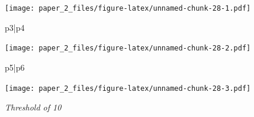 \documentclass[
]{article}
\newenvironment{Shaded}{\begin{snugshade}}{\end{snugshade}}
\newcommand{\NormalTok}[1]{#1}
\newcommand{\SpecialCharTok}[1]{\textcolor[rgb]{0.00,0.00,0.00}{#1}}
\begin{document}
\texttt{[image: paper\_2\_files/figure-latex/unnamed-chunk-28-1.pdf]}

\begin{Shaded}
\begin{Highlighting}[]
\NormalTok{p3}\SpecialCharTok{|}\NormalTok{p4}
\end{Highlighting}
\end{Shaded}

\texttt{[image: paper\_2\_files/figure-latex/unnamed-chunk-28-2.pdf]}

\begin{Shaded}
\begin{Highlighting}[]
\NormalTok{p5}\SpecialCharTok{|}\NormalTok{p6}
\end{Highlighting}
\end{Shaded}

\texttt{[image: paper\_2\_files/figure-latex/unnamed-chunk-28-3.pdf]}

\emph{Threshold of 10}
\end{document}
